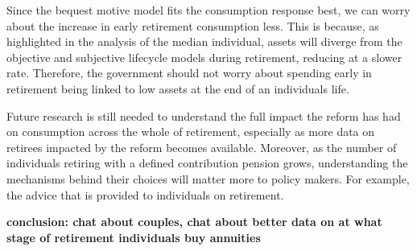\documentclass[12pt]{article}
\begin{document}
Since the bequest motive model fits the consumption response best, we can worry
about the increase in early retirement consumption less. This is because,
as highlighted in the analysis of the median individual, assets will diverge
from the objective and subjective lifecycle models during retirement, reducing
at a slower rate. Therefore, the government should not worry about spending
early in retirement being linked to low assets at the end of an individuals
life.

Future research is still needed to understand the full impact the reform has had
on consumption across the whole of retirement, especially as more data on
retirees impacted by the reform becomes available. Moreover, as the number of
individuals retiring with a defined contribution pension grows, understanding
the mechanisms behind their choices will matter more to policy makers. For
example, the advice that is provided to individuals on retirement.


\textbf{conclusion: chat about couples, chat about better data on at what
    stage of retirement individuals buy annuities}




\end{document}
